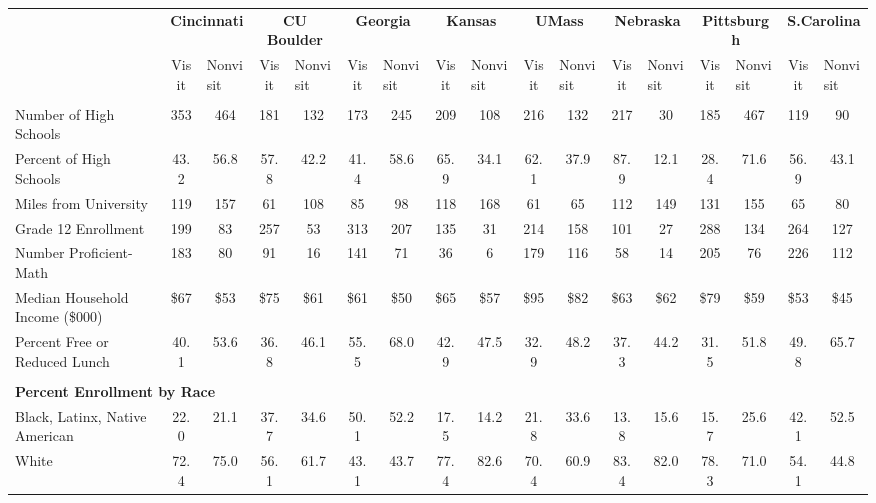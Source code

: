 \begin{tabular*}{\linewidth}{@{\extracolsep{\fill} } lcccccccccccccccc}%
&\multicolumn{2}{c}{\bfseries Cincinnati}&\multicolumn{2}{c}{\bfseries CU Boulder}&\multicolumn{2}{c}{\bfseries Georgia}&\multicolumn{2}{c}{\bfseries Kansas}&\multicolumn{2}{c}{\bfseries UMass}&\multicolumn{2}{c}{\bfseries Nebraska}&\multicolumn{2}{c}{\bfseries Pittsburgh}&\multicolumn{2}{c}{\bfseries S.Carolina}\\%
&Visit&\multicolumn{1}{l}{Nonvisit}&Visit&\multicolumn{1}{l}{Nonvisit}&Visit&\multicolumn{1}{l}{Nonvisit}&Visit&\multicolumn{1}{l}{Nonvisit}&Visit&\multicolumn{1}{l}{Nonvisit}&Visit&\multicolumn{1}{l}{Nonvisit}&Visit&\multicolumn{1}{l}{Nonvisit}&Visit&\multicolumn{1}{l}{Nonvisit}\\%
\hline%
&&&&&&&&&&&&&&&&\\%
\hspace{0cm}Number of High Schools&353&464&181&132&173&245&209&108&216&132&217&30&185&467&119&90\\%
Percent of High Schools&43.2&56.8&57.8&42.2&41.4&58.6&65.9&34.1&62.1&37.9&87.9&12.1&28.4&71.6&56.9&43.1\\%
\hspace{0cm}Miles from University&119&157&61&108&85&98&118&168&61&65&112&149&131&155&65&80\\%
\hspace{0cm}Grade 12 Enrollment&199&83&257&53&313&207&135&31&214&158&101&27&288&134&264&127\\%
\hspace{0cm}Number Proficient{-}Math&183&80&91&16&141&71&36&6&179&116&58&14&205&76&226&112\\%
\hspace{0cm}Median Household Income (\$000)&\$67&\$53&\$75&\$61&\$61&\$50&\$65&\$57&\$95&\$82&\$63&\$62&\$79&\$59&\$53&\$45\\%
\hspace{0cm}Percent Free or Reduced Lunch&40.1&53.6&36.8&46.1&55.5&68.0&42.9&47.5&32.9&48.2&37.3&44.2&31.5&51.8&49.8&65.7\\%
&&&&&&&&&&&&&&&&\\%
\multicolumn{17}{l}{\bfseries Percent Enrollment by Race}\\%
\hspace{0.2cm}Black, Latinx, Native American&22.0&21.1&37.7&34.6&50.1&52.2&17.5&14.2&21.8&33.6&13.8&15.6&15.7&25.6&42.1&52.5\\%
\hspace{0.2cm}White&72.4&75.0&56.1&61.7&43.1&43.7&77.4&82.6&70.4&60.9&83.4&82.0&78.3&71.0&54.1&44.8\\%

\end{tabular*}
